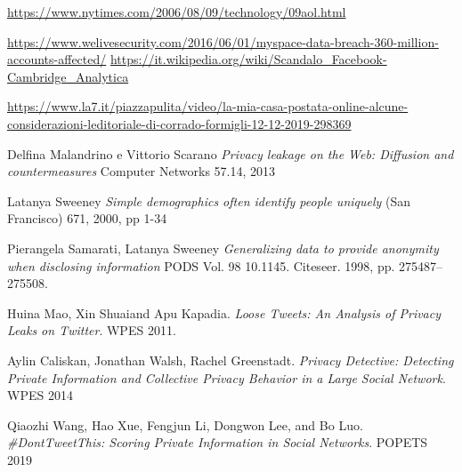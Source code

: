 \begin{thebibliography}{9}

\url{https://www.nytimes.com/2006/08/09/technology/09aol.html}

\url{https://www.welivesecurity.com/2016/06/01/myspace-data-breach-360-million-accounts-affected/}
\url{https://it.wikipedia.org/wiki/Scandalo_Facebook-Cambridge_Analytica}

\href{https://www.la7.it/piazzapulita/video/la-mia-casa-postata-online-alcune-considerazioni-leditoriale-di-corrado-formigli-12-12-2019-298369}{https://www.la7.it/piazzapulita/video/la-mia-casa-postata-online-alcune-considerazioni-leditoriale-di-corrado-formigli-12-12-2019-298369}

Delfina Malandrino e Vittorio Scarano\newline
\textit{Privacy leakage on the Web: Diffusion and countermeasures}\newline
Computer Networks 57.14, 2013

Latanya Sweeney\newline
\textit{Simple demographics often identify people uniquely}\newline
(San Francisco) 671, 2000, pp 1-34

Pierangela Samarati, Latanya Sweeney\newline
\textit{Generalizing data to provide anonymity when disclosing information}\newline
PODS Vol. 98 10.1145. Citeseer. 1998, pp. 275487–275508.



Huina Mao, Xin Shuaiand Apu Kapadia.\newline
\textit{Loose Tweets: An Analysis of Privacy Leaks on Twitter}. \newline
WPES 2011.


Aylin Caliskan, Jonathan Walsh, Rachel Greenstadt.\newline
\textit{Privacy Detective: Detecting Private Information and Collective Privacy Behavior in a Large Social Network}.\newline
WPES 2014

Qiaozhi Wang, Hao Xue, Fengjun Li, Dongwon Lee, and Bo Luo.\newline
\textit{\#DontTweetThis: Scoring Private Information in Social Networks}. \newline
POPETS 2019


\end{thebibliography}
